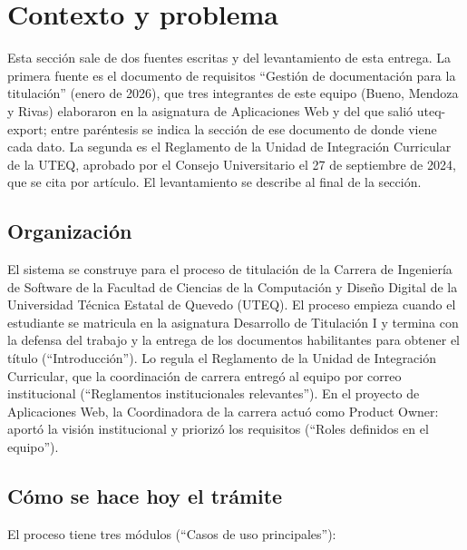 \section{Contexto y problema}\label{sec:contexto}

Esta sección sale de dos fuentes escritas y del levantamiento de esta entrega. La primera fuente es el documento de requisitos \enquote{Gestión de documentación para la titulación} (enero de 2026), que tres integrantes de este equipo (Bueno, Mendoza y Rivas) elaboraron en la asignatura de Aplicaciones Web y del que salió uteq-export; entre paréntesis se indica la sección de ese documento de donde viene cada dato. La segunda es el Reglamento de la Unidad de Integración Curricular de la UTEQ, aprobado por el Consejo Universitario el 27 de septiembre de 2024, que se cita por artículo. El levantamiento se describe al final de la sección.

\subsection{Organización}

El sistema se construye para el proceso de titulación de la Carrera de Ingeniería de Software de la Facultad de Ciencias de la Computación y Diseño Digital de la Universidad Técnica Estatal de Quevedo (UTEQ). El proceso empieza cuando el estudiante se matricula en la asignatura Desarrollo de Titulación I y termina con la defensa del trabajo y la entrega de los documentos habilitantes para obtener el título (\enquote{Introducción}). Lo regula el Reglamento de la Unidad de Integración Curricular, que la coordinación de carrera entregó al equipo por correo institucional (\enquote{Reglamentos institucionales relevantes}). En el proyecto de Aplicaciones Web, la Coordinadora de la carrera actuó como Product Owner: aportó la visión institucional y priorizó los requisitos (\enquote{Roles definidos en el equipo}).

\subsection{Cómo se hace hoy el trámite}

El proceso tiene tres módulos (\enquote{Casos de uso principales}):

